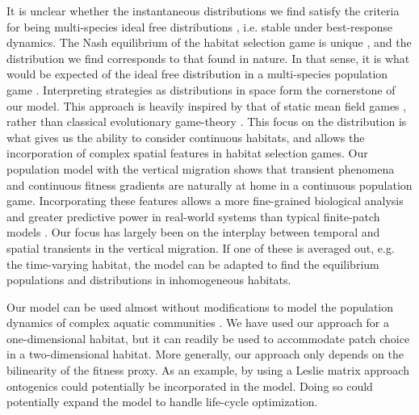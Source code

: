 It is unclear whether the instantaneous distributions we find satisfy the criteria for being multi-species ideal free distributions \citep{kvrivan2008ideal}, i.e. stable under best-response dynamics. The Nash equilibrium of the habitat selection game is unique \citep{verticalmigration}, and the distribution we find corresponds to that found in nature. In that sense, it is what would be expected of the ideal free distribution in a multi-species population game \citep{cressman2004ideal}.
Interpreting strategies as distributions in space form the cornerstone of our model. This approach is heavily inspired by that of static mean field games \citep{lasry2007mean, blanchet2016optimal}, rather than classical evolutionary game-theory \cite{hofbauer1998evolutionary}. This focus on the distribution is what gives us the ability to consider continuous habitats, and allows the incorporation of complex spatial features in habitat selection games. Our population model with the vertical migration shows that transient phenomena and continuous fitness gradients \citep{kawecki2004conceptual} are naturally at home in a continuous population game. Incorporating these features allows a more fine-grained biological analysis and greater predictive power in real-world systems than typical finite-patch models \citep{kvrivan2008ideal, sadowski2019predator}. Our focus has largely been on the interplay between temporal and spatial transients in the vertical migration. If one of these is averaged out, e.g. the time-varying habitat, the model can be adapted to find the equilibrium populations and distributions in inhomogeneous habitats.


Our model can be used almost without modifications to model the population dynamics of complex aquatic communities \citep{pinti2019trophic}. We have used our approach for a one-dimensional habitat, but it can readily be used to accommodate patch choice in a two-dimensional habitat. More generally, our approach only depends on the bilinearity of the fitness proxy. As an example, by using a Leslie matrix approach ontogenics could potentially be incorporated in the model. Doing so could potentially expand the model to handle life-cycle optimization.

